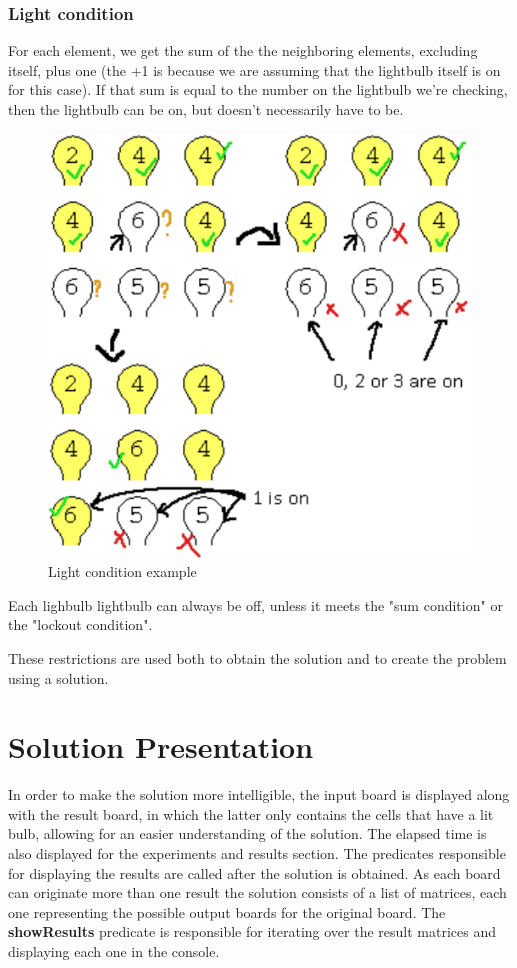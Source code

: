 \documentclass[runningheads]{llncs}
\begin{document}
\subsubsection*{Light condition} \hfill \break
For each element, we get the sum of the the neighboring elements, excluding itself, plus one (the +1 is because we are assuming that the lightbulb itself is on for this case).
If that sum is equal to the number on the lightbulb we're checking, then the lightbulb can be on, but doesn't necessarily have to be.

\begin{figure}
	\includegraphics[scale=0.5]{lightbulb_light_condition_example}
	\centering
	\caption{Light condition example}
	\centering
\end{figure}

Each lighbulb lightbulb can always be off, unless it meets the "sum condition" or the "lockout condition".\hfill \break

These restrictions are used both to obtain the solution and to create the problem using a solution.\hfill \break



\clearpage
\section{Solution Presentation}
In order to make the solution more intelligible, the input board is displayed along with the result board, in which the latter
only contains the cells that have a lit bulb, allowing for an easier understanding of the solution. The elapsed time is also displayed for the experiments and results section.\hfill \break
The predicates responsible for displaying the results are called after the solution is obtained. As each board can originate more than one result the solution consists of a list of matrices, each one representing the possible output boards for the original board. The \textbf{showResults} predicate is responsible for iterating over the result matrices and displaying each one in the console.
\end{document}
